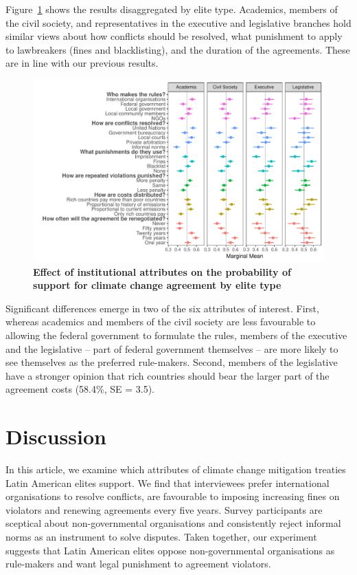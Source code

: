 \documentclass[a4paper,12pt]{article}
\begin{document}
Figure~\ref{fig:types} shows the results disaggregated by elite type. Academics, members of the civil society, and representatives in the executive and legislative branches hold similar views about how conflicts should be resolved, what punishment to apply to lawbreakers (fines and blacklisting), and the duration of the agreements. These are in line with our previous results.

\begin{figure}[H]
	\centering
	\includegraphics[width=\linewidth]{types.pdf}
	\caption{\textbf{Effect of institutional attributes on the probability of support for climate change agreement by elite type}}
	\label{fig:types}
\end{figure}

Significant differences emerge in two of the six attributes of interest. First, whereas academics and members of the civil society are less favourable to allowing the federal government to formulate the rules, members of the executive and the legislative -- part of federal government themselves -- are more likely to see themselves as the preferred rule-makers. Second, members of the legislative have a stronger opinion that rich countries should bear the larger part of the agreement costs (58.4\%, SE = 3.5). 

\section{Discussion}
\label{sec:discussion}

In this article, we examine which attributes of climate change mitigation treaties Latin American elites support. We find that interviewees prefer international organisations to resolve conflicts, are favourable to imposing increasing fines on violators and renewing agreements every five years. Survey participants are sceptical about non-governmental organisations and consistently reject informal norms as an instrument to solve disputes. Taken together, our experiment suggests that Latin American elites oppose non-governmental organisations as rule-makers and want legal punishment to agreement violators. 
\end{document}
